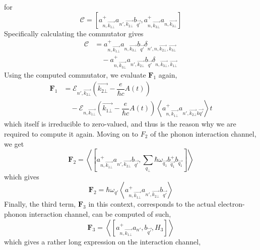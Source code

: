 \documentclass[%
 reprint,
 amsmath,amssymb,
 aps,
]{revtex4-2}
\begin{document}
for 
\begin{equation}
    \mathcal{C} = \left[a^+_{n,\vec{k_{1\bot}}}a_{n',\vec{k_{2\bot}}}b_{\vec{q'}},a^+_{n,\vec{k_{3\bot}}}a_{n,\vec{k_{3\bot}}} \right]
\end{equation}
Specifically calculating the commutator gives
\begin{equation}
    \begin{split}
        \mathcal{C}
        &= a^+_{n,\vec{k_{1\bot}}} a_{n, \vec{k_{3\bot}}}b_{\vec{q'}}\delta_{n',n, \vec{k_{2\bot}}, \vec{k_{3\bot}}}\\
        &\quad - a^+_{n, \vec{k_{3\bot}}}a_{n', \vec{k_{2\bot}}}b_{\vec{q'}} \delta_{n, \vec{k_{3\bot}}, \vec{k_{1\bot}}}
    \end{split}
\end{equation}
Using the computed commutator, we evaluate $\mathbf{F}_{1}$ again,
\begin{equation}
    \begin{split}
        \mathbf{F}_{1} 
        & = \mathcal{E}_{n',\vec{k_{2\bot}}}\left(\vec{k_{2\bot}}-\dfrac{e}{\hbar c}A(t)\right)\\
        & \quad -\mathcal{E}_{n, \vec{k_{1\bot}}}\left(\vec{k_{1\bot}}-\dfrac{e}{\hbar c}A(t)\right)\left \langle a^+_{n, \vec{k_{1\bot}}}a_{n',\vec{k_{2\bot}}k\vec{q'}}\right \rangle t
    \end{split}
\end{equation}
which itself is irreducible to zero-valued, and thus is the reason why we are required to compute it again. Moving on to $F_{2}$ of the phonon interaction channel, we get
\begin{equation}
    \mathbf{F}_{2} = \left \langle \left[a^+_{n,\vec{k_{1\bot}}}a_{n',\vec{k_{2\bot}}}b_{\vec{q'}}, \sum_{q_\bot} \hbar \omega_{\vec{q_1}} b^+_{\vec{q_1}} b_{\vec{q_1}}\right] \right \rangle
\end{equation}
which gives
\begin{equation}
    \mathbf{F}_{2} =  \hbar \omega_{q'} \left \langle a^+_{n, \vec{k_{1\bot}}}a_{n', \vec{k_{2\bot}}}b_{\vec{q'}}\right \rangle
\end{equation}
Finally, the third term, $\mathbf{F}_{3}$ in this context, corresponds to the actual electron-phonon interaction channel, can be computed of such,
\begin{equation}
    \mathbf{F}_{3} = \left \langle \left[a^+_{n,\vec{k_{1\bot}}}a_{n'},b_{\vec{q'}} , H_{3}\right] \right \rangle
\end{equation}
which gives a rather long expression on the interaction channel,
\end{document}
